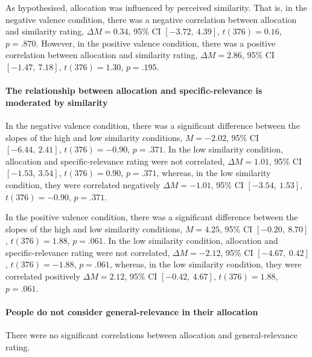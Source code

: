 \documentclass[a4paper, nobind, dvipsnames]{templates/ociamthesis}
\newcommand*{\bibtitle}{References}
\theoremstyle{definition}
\theoremstyle{definition}
\theoremstyle{definition}
\theoremstyle{definition}
\theoremstyle{remark}
\begin{document}
As hypothesised, allocation was influenced by perceived similarity. That is, in
the negative valence condition, there was a negative correlation between
allocation and similarity rating,
\(\Delta M = 0.34\), 95\% CI \([-3.72,~4.39]\), \(t(376) = 0.16\), \(p = .870\).
However, in the positive valence condition,
there was a positive correlation between allocation and similarity rating,
\(\Delta M = 2.86\), 95\% CI \([-1.47,~7.18]\), \(t(376) = 1.30\), \(p = .195\).

\paragraph{The relationship between allocation and specific-relevance is moderated by similarity}

In the negative valence condition, there was a significant difference between
the slopes of the high and low similarity conditions,
\(M = -2.02\), 95\% CI \([-6.44,~2.41]\), \(t(376) = -0.90\), \(p = .371\).
In the low similarity condition, allocation and specific-relevance rating were
not correlated,
\(\Delta M = 1.01\), 95\% CI \([-1.53,~3.54]\), \(t(376) = 0.90\), \(p = .371\),
whereas, in the low similarity condition, they were correlated negatively
\(\Delta M = -1.01\), 95\% CI \([-3.54,~1.53]\), \(t(376) = -0.90\), \(p = .371\).

In the positive valence condition, there was a significant difference between
the slopes of the high and low similarity conditions,
\(M = 4.25\), 95\% CI \([-0.20,~8.70]\), \(t(376) = 1.88\), \(p = .061\).
In the low similarity condition, allocation and specific-relevance rating were
not correlated,
\(\Delta M = -2.12\), 95\% CI \([-4.67,~0.42]\), \(t(376) = -1.88\), \(p = .061\),
whereas, in the low similarity condition, they were correlated positively
\(\Delta M = 2.12\), 95\% CI \([-0.42,~4.67]\), \(t(376) = 1.88\), \(p = .061\).

\paragraph{People do not consider general-relevance in their allocation}

There were no significant correlations between allocation and general-relevance
rating.




\setlength{\baselineskip}{0pt} %

{\renewcommand*\MakeUppercase[1]{#1}%
\printbibliography[heading=bibintoc,title={\bibtitle}]}
\end{document}
